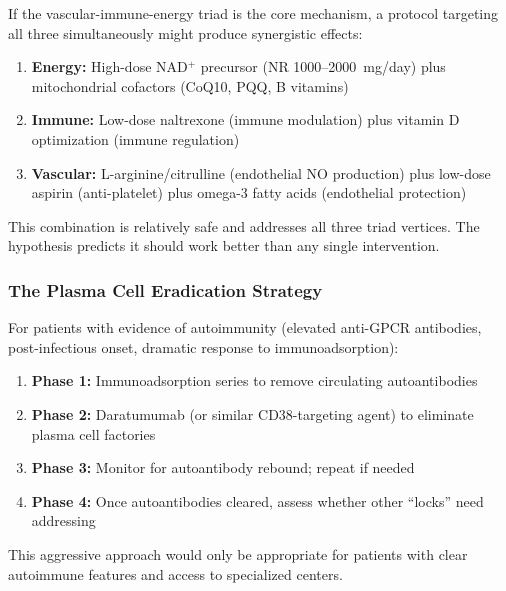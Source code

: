 \begin{speculation}
If the vascular-immune-energy triad is the core mechanism, a protocol targeting all three simultaneously might produce synergistic effects:

\begin{enumerate}
    \item \textbf{Energy:} High-dose NAD$^+$ precursor (NR 1000--2000~mg/day) plus mitochondrial cofactors (CoQ10, PQQ, B vitamins)
    \item \textbf{Immune:} Low-dose naltrexone (immune modulation) plus vitamin D optimization (immune regulation)
    \item \textbf{Vascular:} L-arginine/citrulline (endothelial NO production) plus low-dose aspirin (anti-platelet) plus omega-3 fatty acids (endothelial protection)
\end{enumerate}

This combination is relatively safe and addresses all three triad vertices. The hypothesis predicts it should work better than any single intervention.
\end{speculation}

\subsubsection{The Plasma Cell Eradication Strategy}

\begin{speculation}
For patients with evidence of autoimmunity (elevated anti-GPCR antibodies, post-infectious onset, dramatic response to immunoadsorption):

\begin{enumerate}
    \item \textbf{Phase 1:} Immunoadsorption series to remove circulating autoantibodies
    \item \textbf{Phase 2:} Daratumumab (or similar CD38-targeting agent) to eliminate plasma cell factories
    \item \textbf{Phase 3:} Monitor for autoantibody rebound; repeat if needed
    \item \textbf{Phase 4:} Once autoantibodies cleared, assess whether other ``locks'' need addressing
\end{enumerate}

This aggressive approach would only be appropriate for patients with clear autoimmune features and access to specialized centers.
\end{speculation}

